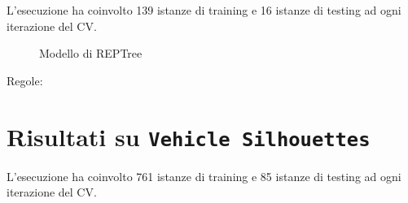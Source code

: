\normalsize L'esecuzione ha coinvolto 139 istanze di training e 16 istanze di testing ad ogni iterazione del CV.

\begin{mdframed}[frametitle=Esecuzione NaiveBayesSimple]
	\footnotesize
\end{mdframed}


\begin{mdframed}[frametitle=Esecuzione REPTree]
	\footnotesize
\end{mdframed}


\begin{figure}[htb]
	\caption{Modello di REPTree}
\end{figure}

\begin{mdframed}[frametitle=Esecuzione JRip]
	\footnotesize
\end{mdframed}


\noindent
\normalsize Regole:
\footnotesize

\pagebreak

\section{Risultati su \texttt{Vehicle Silhouettes}}

\normalsize L'esecuzione ha coinvolto 761 istanze di training e 85 istanze di testing ad ogni iterazione del CV.

\begin{mdframed}[frametitle=Esecuzione NaiveBayesSimple]
	\footnotesize
\end{mdframed}


\begin{mdframed}[frametitle=Esecuzione REPTree]
	\scriptsize
\end{mdframed}


